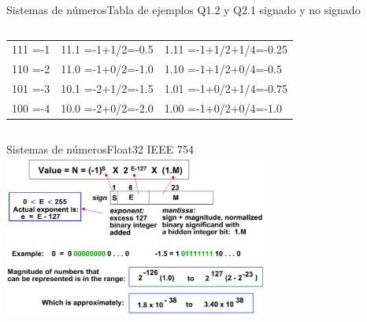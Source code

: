 \begin{frame}[t]{Sistemas de números}{Tabla de ejemplos Q1.2 y Q2.1 signado y no signado }
\begin{columns}[t]
\begin{column}[t]{.5\textwidth}
\begin{table}[]
\begin{tabular}{|l|l|l|}
                111 =-1 & 11.1 =-1+1/2=-0.5 & 1.11 =-1+1/2+1/4=-0.25\\
                110 =-2 & 11.0 =-1+0/2=-1.0 & 1.10 =-1+1/2+0/4=-0.5 \\
                101 =-3 & 10.1 =-2+1/2=-1.5 & 1.01 =-1+0/2+1/4=-0.75\\
                100 =-4 & 10.0 =-2+0/2=-2.0 & 1.00 =-1+0/2+0/4=-1.0 \\
             \hline
             \end{tabular}
          \end{table}
       \end{column}
    \end{columns}
    \vfill
 \end{frame}
 \begin{frame}[t]{Sistemas de números}{Float32 IEEE 754}
       \center\includegraphics[width=0.65\textwidth]{2_clase/float32_example}
    \vfill
 \end{frame}
